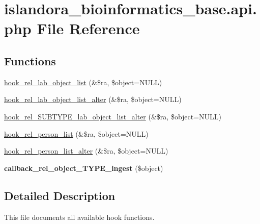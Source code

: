 \hypertarget{islandora__bioinformatics__base_8api_8php}{\section{islandora\+\_\+bioinformatics\+\_\+base.\+api.\+php File Reference}
\label{islandora__bioinformatics__base_8api_8php}
}
\subsection*{Functions}
\begin{DoxyCompactItemize}
\item 
\hyperlink{islandora__bioinformatics__base_8api_8php_a321ca0d36a66578787468d5e07fc9b6e}{hook\+\_\+rel\+\_\+lab\+\_\+object\+\_\+list} (\&\$ra, \$object=N\+U\+L\+L)
\item 
\hyperlink{islandora__bioinformatics__base_8api_8php_adc8820147ebe1b861ed75046759e6940}{hook\+\_\+rel\+\_\+lab\+\_\+object\+\_\+list\+\_\+alter} (\&\$ra, \$object=N\+U\+L\+L)
\item 
\hyperlink{islandora__bioinformatics__base_8api_8php_aa8dcab9498fafc8e5482042683c94fe6}{hook\+\_\+rel\+\_\+\+S\+U\+B\+T\+Y\+P\+E\+\_\+lab\+\_\+object\+\_\+list\+\_\+alter} (\&\$ra, \$object=N\+U\+L\+L)
\item 
\hyperlink{islandora__bioinformatics__base_8api_8php_a90d89ea68057fed2914c45ff01060ca5}{hook\+\_\+rel\+\_\+person\+\_\+list} (\&\$ra, \$object=N\+U\+L\+L)
\item 
\hyperlink{islandora__bioinformatics__base_8api_8php_aef5a146d62e217fddc39b9efe8b60c37}{hook\+\_\+rel\+\_\+person\+\_\+list\+\_\+alter} (\&\$ra, \$object=N\+U\+L\+L)
\item 
\hypertarget{islandora__bioinformatics__base_8api_8php_aa5eec94bf3bc8d1420539908b9c8e192}{{\bfseries callback\+\_\+rel\+\_\+object\+\_\+\+T\+Y\+P\+E\+\_\+ingest} (\$object)}\label{islandora__bioinformatics__base_8api_8php_aa5eec94bf3bc8d1420539908b9c8e192}

\end{DoxyCompactItemize}


\subsection{Detailed Description}
This file documents all available hook functions. 

